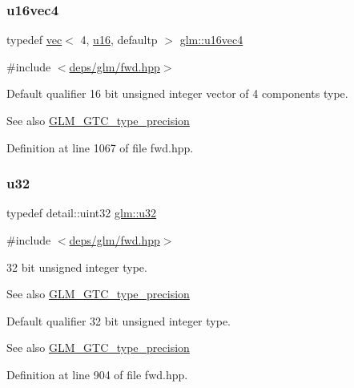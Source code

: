 \subsubsection{\texorpdfstring{u16vec4}{u16vec4}}
{\footnotesize\ttfamily typedef \hyperlink{structglm_1_1vec}{vec}$<$ 4, \hyperlink{group__gtc__type__precision_gae7a1571503f83d2264ddfa705a6b082a}{u16}, defaultp $>$ \hyperlink{group__gtc__type__precision_ga049d45ad8d0f78578d7ceb86a7fdaae4}{glm\+::u16vec4}}



{\ttfamily \#include $<$\hyperlink{fwd_8hpp}{deps/glm/fwd.\+hpp}$>$}

Default qualifier 16 bit unsigned integer vector of 4 components type. \begin{DoxySeeAlso}{See also}
\hyperlink{group__gtc__type__precision}{G\+L\+M\+\_\+\+G\+T\+C\+\_\+type\+\_\+precision} 
\end{DoxySeeAlso}


Definition at line 1067 of file fwd.\+hpp.

\mbox{\label{group__gtc__type__precision_ga54e837745059fd29017bed71cfa0a8db}} 
\subsubsection{\texorpdfstring{u32}{u32}}
{\footnotesize\ttfamily typedef detail\+::uint32 \hyperlink{group__gtc__type__precision_ga54e837745059fd29017bed71cfa0a8db}{glm\+::u32}}



{\ttfamily \#include $<$\hyperlink{fwd_8hpp}{deps/glm/fwd.\+hpp}$>$}

32 bit unsigned integer type. \begin{DoxySeeAlso}{See also}
\hyperlink{group__gtc__type__precision}{G\+L\+M\+\_\+\+G\+T\+C\+\_\+type\+\_\+precision}
\end{DoxySeeAlso}
Default qualifier 32 bit unsigned integer type. \begin{DoxySeeAlso}{See also}
\hyperlink{group__gtc__type__precision}{G\+L\+M\+\_\+\+G\+T\+C\+\_\+type\+\_\+precision} 
\end{DoxySeeAlso}


Definition at line 904 of file fwd.\+hpp.

